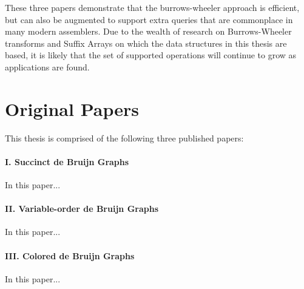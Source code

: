 These three papers demonstrate that the burrows-wheeler approach is efficient, but can also be augmented to support extra queries that are commonplace in many modern assemblers. Due to the wealth of research on Burrows-Wheeler transforms and Suffix Arrays on which the data
structures in this thesis are based, it is likely that the set of supported operations will continue to grow as applications are found.

\section*{Original Papers}

This thesis is comprised of the following three published papers:

\paragraph{I. Succinct de Bruijn Graphs}

In this paper...

\paragraph{II. Variable-order de Bruijn Graphs}

In this paper...

\paragraph{III. Colored de Bruijn Graphs}

In this paper...
%
